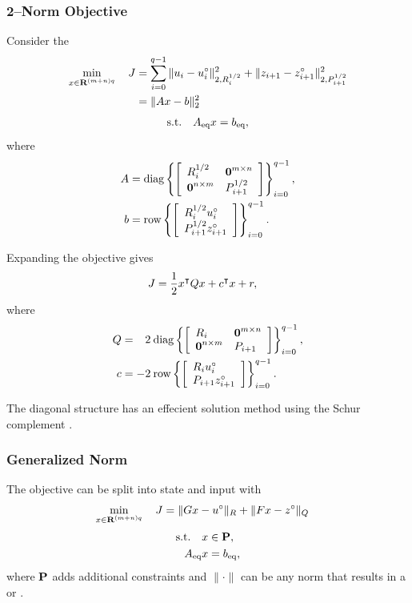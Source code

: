 \documentclass{article}
\begin{document}
    \subsubsection{2--Norm Objective}

    Consider the \QP
    \begin{align*}
        \min_{x\in\textbf{R}^{(m+n)q}}\quad J 
        &=\sum_{i=0}^{q-1} \|u_i-u_i^\circ\|_{2,R_i^{1/2}}^2+\|z_{i+1}-z_{i+1}^\circ\|_{2,P_{i+1}^{1/2}}^2
        \\
        &=\|Ax-b\|_2^2
        \end{align*}
        \begin{align*}
            \text{s.t.} \quad A_{\text{eq}} x = b_{\text{eq}},
        \end{align*}
        where
        \begin{align*}
            A&=\text{diag}\left\{\left[\begin{array}{lllllllllllllllllll}R_{i}^{1/2}&\textbf{0}^{m\times n}\\
                \textbf{0}^{n\times m}&P_{i+1}^{1/2}\end{array}\right]\right\}_{i=0}^{q-1},\\
            b&=\text{row}\left\{\left[\begin{array}{lllllllllllllllllll}R_{i}^{1/2}u_i^\circ\\P_{i+1}^{1/2}z_{i+1}^\circ\end{array}\right]\right\}_{i=0}^{q-1}.
        \end{align*}

    Expanding the objective gives
    \begin{align*}
        J 
        &=\frac{1}{2}x^\intercal Q x + c^\intercal x + r,
    \end{align*}
    where
    \begin{align*}
        Q&=\minus2\:\diag\left\{\mat{R_{i}&\zeros^{m\times n}\\
            \zeros^{n\times m}&P_{i+1}}\right\}_{i=0}^{q-1},\\
        c&=-2\:\row\left\{\mat{R_{i}u_i^\circ\\P_{i+1}z_{i+1}^\circ}\right\}_{i=0}^{q-1}.
    \end{align*}

    The diagonal structure has an effecient solution method using the Schur complement
    \cite[p.~552]{bv_cvxbook}.

\subsubsection{Generalized Norm}

    The objective can be split into state and input with
    \begin{align*}
        \min_{x\in\textbf{R}^{(m+n)q}}\quad J 
        &=\|Gx-u^\circ\|_R+\|Fx-z^\circ\|_Q
        \end{align*}
        \begin{align*}
            \text{s.t.} \quad x&\in\textbf{P},\\ 
            A_{\text{eq}} x &= b_{\text{eq}},
        \end{align*}
    where $\textbf{P}$ adds additional constraints and $\|\cdot\|$ can be any norm
    that results in a \LP or \QP.
\end{document}
